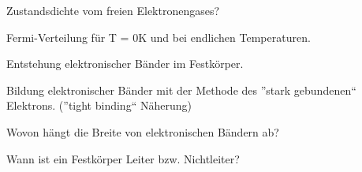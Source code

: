 \documentclass[a5paper,12pt,ngerman,grid=front %
,print
]{kartei}
\begin{document}
	\begin{karte}{
		Zustandsdichte vom freien Elektronengases?
		}
		
		
		
	\end{karte}


	\begin{karte}{
		Fermi-Verteilung für T = 0K und bei endlichen Temperaturen.
		}
		
		
		
	\end{karte}


	\begin{karte}{
		Entstehung elektronischer Bänder im Festkörper.
		}
		
		
		
	\end{karte}


	\begin{karte}{
		Bildung elektronischer Bänder mit der Methode des ”stark gebundenen“ Elektrons. 
		(”tight binding“ Näherung)
		}
		
		
		
	\end{karte}


	\begin{karte}{
		Wovon hängt die Breite von elektronischen Bändern ab?
		}
		
		
		
	\end{karte}


	\begin{karte}{
		Wann ist ein Festkörper Leiter bzw. Nichtleiter?
		}
		
		
		
	\end{karte}

\end{document}
